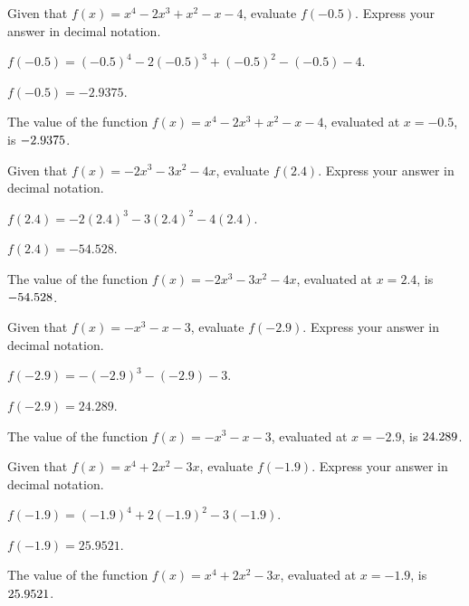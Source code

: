 \begin{shuffle}
\begin{exercise}
Given that $f(x)=x^4-2 x^3+x^2-x-4$, evaluate $f(-0.5)$. Express your answer in decimal notation.
\begin{solution}
\begin{hint}
$f(-0.5)=(-0.5)^4-2 (-0.5)^3+(-0.5)^2-(-0.5)-4$.
\end{hint}
\begin{hint}
$f(-0.5)=-2.9375$.
\end{hint}
The value of the function $f(x) = x^4-2 x^3+x^2-x-4$, evaluated at $x=-0.5$, is ${-2.9375}$.
\end{solution}
\end{exercise}

\begin{exercise}
Given that $f(x)=-2 x^3-3 x^2-4 x$, evaluate $f(2.4)$. Express your answer in decimal notation.
\begin{solution}
\begin{hint}
$f(2.4)=-2 (2.4)^3-3 (2.4)^2-4 (2.4)$.
\end{hint}
\begin{hint}
$f(2.4)=-54.528$.
\end{hint}
The value of the function $f(x) = -2 x^3-3 x^2-4 x$, evaluated at $x=2.4$, is ${-54.528}$.
\end{solution}
\end{exercise}

\begin{exercise}
Given that $f(x)=-x^3-x-3$, evaluate $f(-2.9)$. Express your answer in decimal notation.
\begin{solution}
\begin{hint}
$f(-2.9)=-(-2.9)^3-(-2.9)-3$.
\end{hint}
\begin{hint}
$f(-2.9)=24.289$.
\end{hint}
The value of the function $f(x) = -x^3-x-3$, evaluated at $x=-2.9$, is ${24.289}$.
\end{solution}
\end{exercise}

\begin{exercise}
Given that $f(x)=x^4+2 x^2-3 x$, evaluate $f(-1.9)$. Express your answer in decimal notation.
\begin{solution}
\begin{hint}
$f(-1.9)=(-1.9)^4+2 (-1.9)^2-3 (-1.9)$.
\end{hint}
\begin{hint}
$f(-1.9)=25.9521$.
\end{hint}
The value of the function $f(x) = x^4+2 x^2-3 x$, evaluated at $x=-1.9$, is ${25.9521}$.
\end{solution}
\end{exercise}


\end{shuffle}
